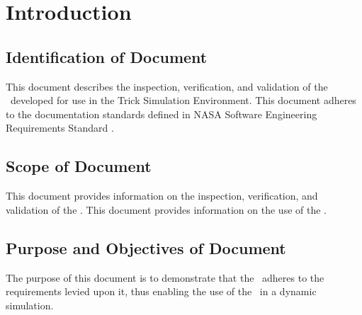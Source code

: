 \documentclass[twoside,11pt,titlepage]{report}
\begin{document}

\date{DATE}
\modelname{\MODEL}
\author{YOUR NAME}
\makeTrickhlaenvTitlepage



\tableofcontents
\vfill

\pagebreak


\chapter{Introduction}\label{sec:intro}



\section{Identification of Document}
This document describes the inspection, verification, and validation of
the \MODEL\ developed for use in the Trick Simulation Environment.
This document adheres to the documentation standards defined in
NASA Software Engineering Requirements Standard \cite{NASA:SWE}.

\section{Scope of Document}
This document provides information on
the inspection, verification, and validation of the \MODEL.
This document provides information on the use of the \MODEL.

\section{Purpose and Objectives of Document}
The purpose of this document is to demonstrate that
the \MODEL\ adheres to the requirements levied upon it,
thus enabling the use of the \MODEL\ in a dynamic simulation.
\end{document}
